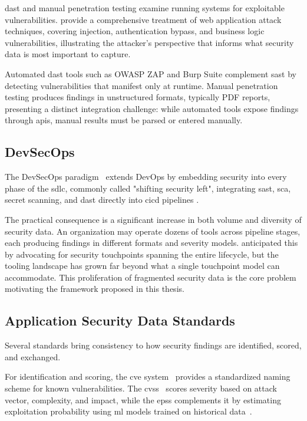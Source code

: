 \Gls{dast} and manual penetration testing examine running systems for exploitable vulnerabilities. \textcite{Stuttard2011} provide a comprehensive treatment of web application attack techniques, covering injection, authentication bypass, and business logic vulnerabilities, illustrating the attacker's perspective that informs what security data is most important to capture.

Automated \gls{dast} tools such as OWASP ZAP and Burp Suite complement \gls{sast} by detecting vulnerabilities that manifest only at runtime. Manual penetration testing produces findings in unstructured formats, typically PDF reports, presenting a distinct integration challenge: while automated tools expose findings through \glspl{api}, manual results must be parsed or entered manually.


\subsection{DevSecOps}
\label{sec:devsecops}

The DevSecOps paradigm~\parencite{Mack2023} extends DevOps by embedding security into every phase of the \gls{sdlc}, commonly called "shifting security left", integrating \gls{sast}, \gls{sca}, secret scanning, and \gls{dast} directly into \gls{cicd} pipelines \parencite{Kim2021}.

The practical consequence is a significant increase in both volume and diversity of security data. An organization may operate dozens of tools across pipeline stages, each producing findings in different formats and severity models. \textcite{McGraw2006} anticipated this by advocating for security touchpoints spanning the entire lifecycle, but the tooling landscape has grown far beyond what a single touchpoint model can accommodate. This proliferation of fragmented security data is the core problem motivating the framework proposed in this thesis.


\subsection{Application Security Data Standards}
\label{sec:data-standards}

Several standards bring consistency to how security findings are identified, scored, and exchanged.

For identification and scoring, the \gls{cve} system~\parencite{MITRE2024} provides a standardized naming scheme for known vulnerabilities. The \gls{cvss}~\parencite{FIRST2019} scores severity based on attack vector, complexity, and impact, while the \gls{epss} complements it by estimating exploitation probability using \gls{ml} models trained on historical data~\parencite{Jacobs2021}.

